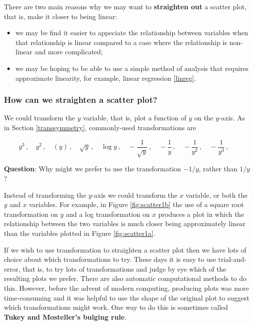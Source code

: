 \documentclass[
  british,
]{book}
\providecommand{\tightlist}{%
  \setlength{\itemsep}{0pt}\setlength{\parskip}{0pt}}
\begin{document}
There are two main reasons why we may want to \textbf{straighten out} a scatter plot, that is, make it closer to being linear:

\begin{itemize}
\tightlist
\item
  we may be find it easier to appeciate the relationship between variables when that relationship is linear compared to a case where the relationship is non-linear and more complicated;
\item
  we may be hoping to be able to use a simple method of analysis that requires approximate linearity, for example, linear regression \ref{linreg}.
\end{itemize}

\hypertarget{how-can-we-straighten-a-scatter-plot}{%
\subsubsection*{How can we straighten a scatter plot?}\label{how-can-we-straighten-a-scatter-plot}}

We could transform the \(y\) variable, that is, plot a function of \(y\) on the \(y\)-axis. As in Section \ref{transsymmetry}, commonly-used transformations are

\[
y^3\,, \quad
y^2\,, \quad
(y)\,, \quad 
\sqrt{y}\,, \quad
\log y\,, \quad
-\frac{1}{\sqrt{y}}\,, \quad
-\frac1y\,, \quad
-\frac{1}{y^2}\,, \quad
-\frac{1}{y^3}\,, \quad 
\]

\textbf{Question}: Why might we prefer to use the transformation \(-1/y\), rather than \(1/y\)?

Instead of transforming the \(y\)-axis we could transform the \(x\) variable, or both the \(y\) and \(x\) variables. For example, in Figure \ref{fig:scatter1b} the use of a square root transformation on \(y\) and a log transformation on \(x\) produces a plot in which the relationship between the two variables is much closer being approximately linear than the variables plotted in Figure \ref{fig:scatter1a}.

If we wish to use transformation to straighten a scatter plot then we have lots of choice about which transformations to try. These days it is easy to use trial-and-error, that is, to try lots of transformations and judge by eye which of the resulting plots we prefer. There are also automatic computational methods to do this. However, before the advent of modern computing, producing plots was more time-consuming and it was helpful to use the shape of the original plot to suggest which transformations might work. One way to do this is sometimes called \textbf{Tukey and Mosteller's bulging rule}.
\end{document}
